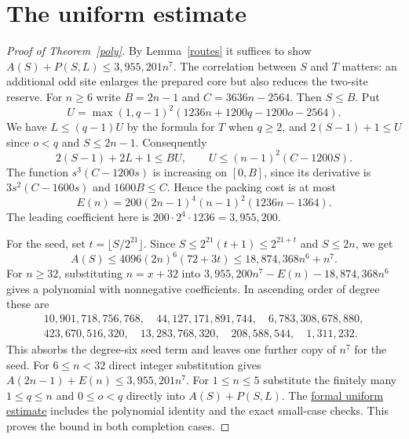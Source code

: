 \documentclass[11pt]{article}
\newcommand{\proofmodule}[2]{\href{https://github.com/Aky-lab/graceful-leaf-threshold-preprint/blob/v1.2/lean/Next/#1.lean}{#2}}
\begin{document}
\section{The uniform estimate}
\begin{proof}[Proof of Theorem~\ref{poly}]
By Lemma~\ref{routes} it suffices to show
$A(S)+P(S,L)\le3{,}955{,}201n^7$. The correlation between $S$ and
$T$ matters: an additional odd site enlarges the prepared core but also
reduces the two-site reserve. For $n\ge6$ write $B=2n-1$ and
$C=3636n-2564$. Then $S\le B$. Put
\[
 U=\max(1,q-1)^2(1236n+1200q-1200o-2564).
\]
We have $L\le(q-1)U$ by the formula for $T$ when $q\ge2$, and
$2(S-1)+1\le U$ since $o<q$ and $S\le2n-1$.
Consequently
\[
 2(S-1)+2L+1\le B U,\qquad U\le(n-1)^2(C-1200S).
\]
The function $s^3(C-1200s)$ is increasing on $[0,B]$, since
its derivative is $3s^2(C-1600s)$ and $1600B\le C$.
Hence the packing cost is at most
\[
 E(n)=200(2n-1)^4(n-1)^2(1236n-1364).
\]
The leading coefficient here is $200\cdot 2^4\cdot1236=3{,}955{,}200$.

For the seed, set $t=\lfloor S/2^{21}\rfloor$. Since
$S\le2^{21}(t+1)\le2^{21+t}$ and $S\le2n$, we get
\[
 A(S)\le4096(2n)^6(72+3t)\le18{,}874{,}368n^6+n^7.
\]
For $n\ge32$, substituting $n=x+32$ into
$3{,}955{,}200n^7-E(n)-18{,}874{,}368n^6$ gives a polynomial with
nonnegative coefficients. In ascending order of degree these are
\[
\begin{gathered}
10{,}901{,}718{,}756{,}768,\quad 44{,}127{,}171{,}891{,}744,\quad
6{,}783{,}308{,}678{,}880,\\
423{,}670{,}516{,}320,\quad 13{,}283{,}768{,}320,\quad
208{,}588{,}544,\quad 1{,}311{,}232 .
\end{gathered}
\]
This absorbs the degree-six seed term and
leaves one further copy of $n^7$ for the seed. For $6\le n<32$ direct
integer substitution gives $A(2n-1)+E(n)\le3{,}955{,}201n^7$.
For $1\le n\le5$ substitute the finitely many $1\le q\le n$ and
$0\le o<q$ directly into $A(S)+P(S,L)$. The
\proofmodule{ParityPacketUniform}{formal uniform estimate} includes
the polynomial identity and the exact small-case checks. This proves the
bound in both completion cases.
\end{proof}
\end{document}
